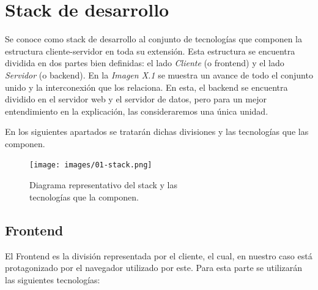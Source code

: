 \documentclass[oneside]{book}
\begin{document}
\section{Stack de desarrollo}

	Se conoce como stack de desarrollo al conjunto de tecnologías que componen la estructura cliente-servidor en toda su extensión. Esta estructura se encuentra dividida en dos partes bien definidas: el lado \textit{Cliente} (o frontend) y el lado \textit{Servidor} (o backend). En la \textit{Imagen X.1} se muestra un avance de todo el conjunto unido y la interconexión que los relaciona. En esta, el backend se encuentra dividido en el servidor web y el servidor de datos, pero para un mejor entendimiento en la explicación, las consideraremos una única unidad.
	\par
	En los siguientes apartados se tratarán dichas divisiones y las tecnologías que las componen.
	\bigskip\bigskip

\begin{figure}[H]
	\centering
	\texttt{[image: images/01-stack.png]}
	\medskip
	\caption{Diagrama representativo del stack y las \\ tecnologías que la componen.}
	\medskip
\end{figure}
\bigskip


\subsection{Frontend}

	El Frontend es la división representada por el cliente, el cual, en nuestro caso está protagonizado por el navegador utilizado por este. Para esta parte se utilizarán las siguientes tecnologías:
\end{document}

